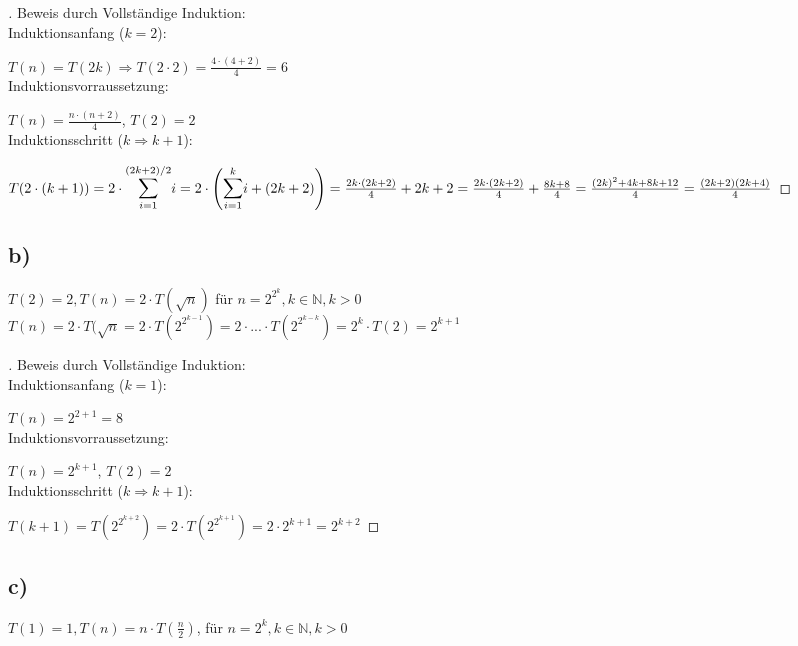 \documentclass[a4paper]{article}
\begin{document}
\begin{proof}[\unskip\nopunct]
Beweis durch Vollständige Induktion:\\

Induktionsanfang ($k = 2$):

$T(n) = T(2k) \Rightarrow T(2 \cdot 2) = \frac{4 \cdot \left(4 + 2\right)}{4} = 6$\\

Induktionsvorraussetzung:

$T(n) = \frac{n \cdot \left(n + 2\right)}{4}$, $T(2) = 2$\\

Induktionsschritt ($k \Rightarrow k + 1$):

$T(2\cdot(k + 1)) = 2 \cdot \mathlarger{\mathlarger{\sum}}_{i = 1}^{(2k + 2)/2}i = 2 \cdot \left(\mathlarger{\mathlarger{\sum}}_{i = 1}^{k}i + (2k + 2)\right) = \frac{2k \cdot \left(2k + 2\right)}{4} + 2k + 2 = \frac{2k \cdot \left(2k + 2\right)}{4} + \frac{8k + 8}{4} = \frac{(2k)^2 + 4k + 8k + 12}{4} = \frac{(2k + 2)(2k + 4)}{4}$

\end{proof}

\subsection*{b)}
$T(2) = 2, T(n) = 2 \cdot T(\sqrt{n})$ für $n = 2^{2^k}, k \in \mathbb{N}, k > 0$\\

$T(n) = 2 \cdot T(\sqrt{n} = 2 \cdot T\left(2^{2^{k - 1}}\right) = 2 \cdot ... \cdot T\left(2^{2^{k - k}}\right) = 2^k \cdot T(2) = 2^{k + 1}$

\begin{proof}[\unskip\nopunct]
Beweis durch Vollständige Induktion:\\

Induktionsanfang ($k = 1$):

$T(n) = 2^{2 + 1} = 8$\\

Induktionsvorraussetzung:

$T(n) = 2^{k + 1}$, $T(2) = 2$\\

Induktionsschritt ($k \Rightarrow k + 1$):

$T(k + 1) = T\left(2^{2^{k + 2}}\right) = 2 \cdot  T\left(2^{2^{k + 1}}\right) = 2 \cdot 2^{k + 1} = 2^{k + 2}$

\end{proof}

\subsection*{c)}
$T(1) = 1, T(n) = n \cdot T(\frac{n}{2})$, für $n = 2^k, k \in \mathbb{N}, k > 0$\\
\end{document}
